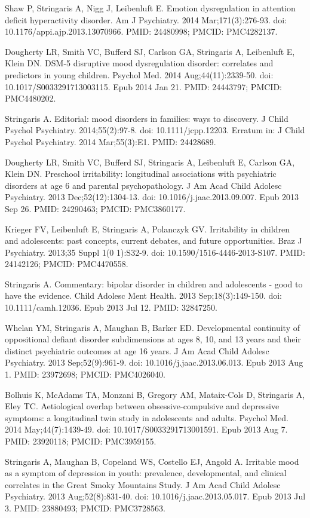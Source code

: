 \documentclass[
]{article}
\begin{document}
Shaw P, Stringaris A, Nigg J, Leibenluft E. Emotion dysregulation in
attention deficit hyperactivity disorder. Am J Psychiatry. 2014
Mar;171(3):276-93. doi: 10.1176/appi.ajp.2013.13070966. PMID: 24480998;
PMCID: PMC4282137.

Dougherty LR, Smith VC, Bufferd SJ, Carlson GA, Stringaris A, Leibenluft
E, Klein DN. DSM-5 disruptive mood dysregulation disorder: correlates
and predictors in young children. Psychol Med. 2014 Aug;44(11):2339-50.
doi: 10.1017/S0033291713003115. Epub 2014 Jan 21. PMID: 24443797; PMCID:
PMC4480202.

Stringaris A. Editorial: mood disorders in families: ways to discovery.
J Child Psychol Psychiatry. 2014;55(2):97-8. doi: 10.1111/jcpp.12203.
Erratum in: J Child Psychol Psychiatry. 2014 Mar;55(3):E1. PMID:
24428689.

Dougherty LR, Smith VC, Bufferd SJ, Stringaris A, Leibenluft E, Carlson
GA, Klein DN. Preschool irritability: longitudinal associations with
psychiatric disorders at age 6 and parental psychopathology. J Am Acad
Child Adolesc Psychiatry. 2013 Dec;52(12):1304-13. doi:
10.1016/j.jaac.2013.09.007. Epub 2013 Sep 26. PMID: 24290463; PMCID:
PMC3860177.

Krieger FV, Leibenluft E, Stringaris A, Polanczyk GV. Irritability in
children and adolescents: past concepts, current debates, and future
opportunities. Braz J Psychiatry. 2013;35 Suppl 1(0 1):S32-9. doi:
10.1590/1516-4446-2013-S107. PMID: 24142126; PMCID: PMC4470558.

Stringaris A. Commentary: bipolar disorder in children and adolescents -
good to have the evidence. Child Adolesc Ment Health. 2013
Sep;18(3):149-150. doi: 10.1111/camh.12036. Epub 2013 Jul 12. PMID:
32847250.

Whelan YM, Stringaris A, Maughan B, Barker ED. Developmental continuity
of oppositional defiant disorder subdimensions at ages 8, 10, and 13
years and their distinct psychiatric outcomes at age 16 years. J Am Acad
Child Adolesc Psychiatry. 2013 Sep;52(9):961-9. doi:
10.1016/j.jaac.2013.06.013. Epub 2013 Aug 1. PMID: 23972698; PMCID:
PMC4026040.

Bolhuis K, McAdams TA, Monzani B, Gregory AM, Mataix-Cols D, Stringaris
A, Eley TC. Aetiological overlap between obsessive-compulsive and
depressive symptoms: a longitudinal twin study in adolescents and
adults. Psychol Med. 2014 May;44(7):1439-49. doi:
10.1017/S0033291713001591. Epub 2013 Aug 7. PMID: 23920118; PMCID:
PMC3959155.

Stringaris A, Maughan B, Copeland WS, Costello EJ, Angold A. Irritable
mood as a symptom of depression in youth: prevalence, developmental, and
clinical correlates in the Great Smoky Mountains Study. J Am Acad Child
Adolesc Psychiatry. 2013 Aug;52(8):831-40. doi:
10.1016/j.jaac.2013.05.017. Epub 2013 Jul 3. PMID: 23880493; PMCID:
PMC3728563.
\end{document}
